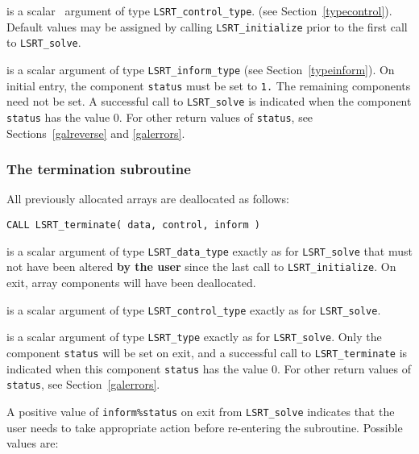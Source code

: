 \documentclass{galahad}
\newcommand{\packagename}{LS\-RT}
\begin{document}
\begin{description}
 is a scalar \intentin\ argument of type
{\tt \packagename\_control\_type}.
(see Section~\ref{typecontrol}).
Default values may be assigned by calling {\tt \packagename\_initialize}
prior to the first call to {\tt \packagename\_solve}.

 is a scalar \intentinout argument of type
{\tt \packagename\_inform\_type}
(see Section~\ref{typeinform}).
On initial entry, the component {\tt status} must be set to {\tt 1.}
The remaining components need not be set.
A successful call to
{\tt \packagename\_solve}
is indicated when the  component {\tt status} has the value 0.
For other return values of {\tt status}, see Sections~\ref{galreverse}
and \ref{galerrors}.
\end{description}


\subsubsection{The  termination subroutine}
All previously allocated arrays are deallocated as follows:

\hskip0.5in
{\tt CALL \packagename\_terminate( data, control, inform )}

\begin{description}

 is a scalar \intentinout argument of type
{\tt \packagename\_data\_type}
exactly as for
{\tt \packagename\_solve}
that must not have been altered {\bf by the user} since the last call to
{\tt \packagename\_initialize}.
On exit, array components will have been deallocated.

 is a scalar \intentin argument of type
{\tt \packagename\_control\_type}
exactly as for
{\tt \packagename\_solve}.

 is a scalar \intentout argument of type {\tt \packagename\_type}
exactly as for
{\tt \packagename\_solve}.
Only the component {\tt status} will be set on exit, and a
successful call to
{\tt \packagename\_terminate}
is indicated when this  component {\tt status} has the value 0.
For other return values of {\tt status}, see Section~\ref{galerrors}.

\end{description}


\galreverse
A positive value of {\tt inform\%status} on exit from
{\tt \packagename\_solve} indicates that the user needs to take appropriate
action before re-entering the subroutine. Possible values are:
\end{document}
